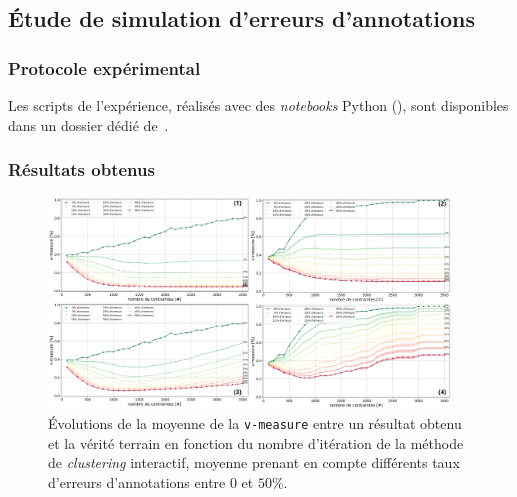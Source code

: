 	
	\subsection{Étude de simulation d'erreurs d'annotations}
	\label{section:4.6.1-ETUDE-ROBUSTESSE-SIMULATION-ERREURS-ANNOTATION}
		
	
		\subsubsection{Protocole expérimental}
			
			
			\begin{leftBarInformation}
				Les scripts de l'expérience, réalisés avec des \textit{notebooks} Python (\cite{van-rossum-drake:2009:python-reference-manual}), sont disponibles dans un dossier dédié de~\cite{schild:2021:cognitivefactory-interactiveclusteringcomparativestudy}.
			\end{leftBarInformation}

		\subsubsection{Résultats obtenus}
		
			
			\begin{figure}[!htb]
				\centering
				\includegraphics[width=0.95\textwidth]{figures/etude-erreur-simulation-impact}
				\caption{Évolutions de la moyenne de la \texttt{v-measure} entre un résultat obtenu et la vérité terrain en fonction du nombre d'itération de la méthode de \textit{clustering} interactif, moyenne prenant en compte différents taux d'erreurs d'annotations entre $0$ et $50$\%.}
				\label{figure:4.6.1-ETUDE-ROBUSTESSE-SIMULATION-ERREURS-ANNOTATION}
			\end{figure}

